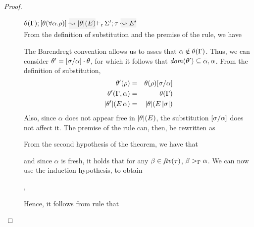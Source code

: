 \begin{proof}
\begin{description}
\item[]\quad
$\dmres{\theta(\tenv)}{\theta(\tall{\alpha}{\rulet})}{\etrans{\theta}(E)}{\type}{E'}{\Sigma'}$\ \\

From the definition of substitution and the premise of the rule, we have
\begin{myequation*}
\end{myequation*}

The Barendregt convention allows us to asses that $\alpha\notin\theta(\Gamma)$. Thus, we can
consider $\theta'=[\sigma/\alpha]\cdot\theta$, for which it follows that
${\it dom }{(\theta')}\subseteq\bar\alpha,\alpha$. From the definition of substitution,
\begin{eqnarray*}
  \theta'(\rho) & = & \theta(\rho)[\sigma/\alpha]\\
  \theta'(\Gamma,\alpha) & = & \theta(\Gamma)\\
  {|\theta'|}(E\,\alpha) & = & {|\theta|}(E\,{|\sigma|})
\end{eqnarray*}
Also, since $\alpha$ does not appear free in ${|\theta|}(E)$, the substitution
$[\sigma/\alpha]$ does not affect it.
The premise of the rule can, then, be rewritten as
\begin{myequation*}
\end{myequation*}
From the second hypothesis of the theorem, we have that
\begin{myequation*}
\end{myequation*}
and since $\alpha$ is fresh, it holds that for any $\beta\in{\it ftv }(\tau)$,
${\beta >_{\Gamma} \alpha}$. We can now use the induction hypothesis, to obtain
\begin{myequation*}
,\end{myequation*}
Hence, it follows from rule  that
\begin{myequation*}
\end{myequation*}
\end{description}
\end{proof}

